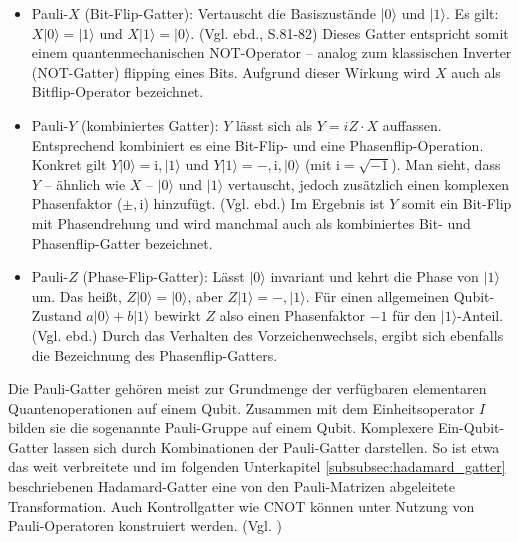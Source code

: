 \begin{itemize}
\item Pauli-$X$ (Bit-Flip-Gatter): Vertauscht die Basiszustände $|0\rangle$ und $|1\rangle$. Es gilt: $X|0\rangle = |1\rangle$ und $X|1\rangle = |0\rangle$. (Vgl. ebd., S.81-82) Dieses Gatter entspricht somit einem quantenmechanischen NOT-Operator – analog zum klassischen Inverter (NOT-Gatter) flipping eines Bits. Aufgrund dieser Wirkung wird $X$ auch als Bitflip-Operator bezeichnet. 

\item Pauli-$Y$ (kombiniertes Gatter): $Y$ lässt sich als $Y = iZ \cdot X$ auffassen. Entsprechend kombiniert es eine Bit-Flip- und eine Phasenflip-Operation. Konkret gilt $Y|0\rangle = \mathrm{i},|1\rangle$ und $Y|1\rangle = -,\mathrm{i},|0\rangle$ (mit $\mathrm{i}=\sqrt{-1}$). Man sieht, dass $Y$ – ähnlich wie $X$ – $|0\rangle$ und $|1\rangle$ vertauscht, jedoch zusätzlich einen komplexen Phasenfaktor ($\pm,\mathrm{i}$) hinzufügt. (Vgl. ebd.) Im Ergebnis ist $Y$ somit ein Bit-Flip mit Phasendrehung und wird manchmal auch als kombiniertes Bit- und Phasenflip-Gatter bezeichnet.

\item Pauli-$Z$ (Phase-Flip-Gatter): Lässt $|0\rangle$ invariant und kehrt die Phase von $|1\rangle$ um. Das heißt, $Z|0\rangle = |0\rangle$, aber $Z|1\rangle = -,|1\rangle$. Für einen allgemeinen Qubit-Zustand $a|0\rangle + b|1\rangle$ bewirkt $Z$ also einen Phasenfaktor $-1$ für den $|1\rangle$-Anteil. (Vgl. ebd.) Durch das Verhalten des Vorzeichenwechsels, ergibt sich ebenfalls die Bezeichnung des Phasenflip-Gatters.

\end{itemize}

Die Pauli-Gatter gehören meist zur Grundmenge der verfügbaren elementaren Quantenoperationen auf einem Qubit. Zusammen mit dem Einheitsoperator $I$ bilden sie die sogenannte Pauli-Gruppe auf einem Qubit. Komplexere Ein-Qubit-Gatter lassen sich durch Kombinationen der Pauli-Gatter darstellen. So ist etwa das weit verbreitete und im folgenden Unterkapitel \ref{subsubsec:hadamard_gatter} beschriebenen Hadamard-Gatter eine von den Pauli-Matrizen abgeleitete Transformation. Auch Kontrollgatter wie CNOT können unter Nutzung von Pauli-Operatoren konstruiert werden. (Vgl. \cite[S.312]{wekesa_sirengo_mathematical_2024})
\\
